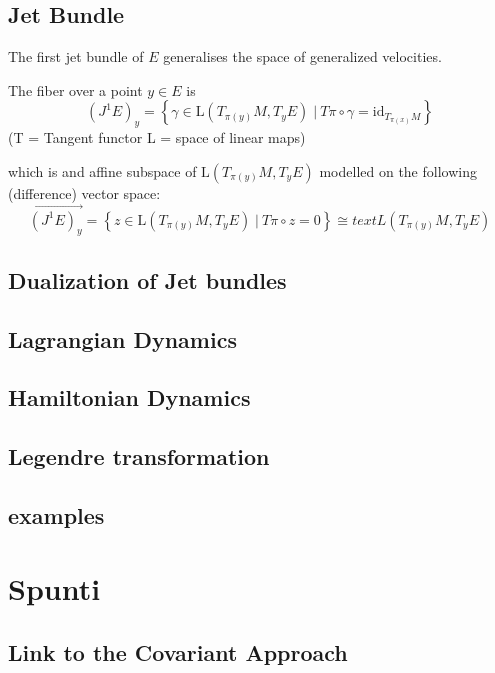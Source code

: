 \documentclass[a4paper,12pt,fleqn]{article}  %
\begin{document}
\subsection{Jet Bundle}
The first jet bundle of $E$ generalises the space of generalized velocities.

The fiber over a point $y\in E$ is
\begin{displaymath}
	\left( J^1 E\right)_y = \left\lbrace \gamma \in \text{L}(T_{\pi(y)}M, T_y E) \; \vert \: T\pi \circ \gamma = \text{id}_{T_{\pi(x)} M} \right\rbrace
\end{displaymath}
(T = Tangent functor L = space of linear maps)

which is and affine subspace of $\text{L}(T_{\pi(y)}M, T_y E)$ modelled on the following (difference) vector space:
\begin{displaymath}
	\vec{\left( J^1 E\right)_y} = \left\lbrace z \in \text{L}(T_{\pi(y)}M, T_y E) \; \vert \: T\pi \circ z = 0 \right\rbrace
	\cong text{L}(T_{\pi(y)}M, T_y E)
\end{displaymath}

\subsection{Dualization of Jet bundles}

\subsection{Lagrangian Dynamics}

\subsection{Hamiltonian Dynamics}

\subsection{Legendre transformation}

\subsection{examples}

\section{Spunti}

\subsection{Link to the Covariant Approach}
\end{document}
